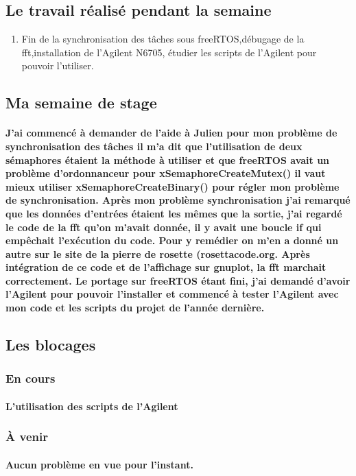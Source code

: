 \documentclass[a4paper]{article}
\begin{document}
 \subsection{Le travail réalisé pendant la semaine}
 \begin{enumerate}
\item {Fin de la synchronisation des tâches sous freeRTOS,débugage de la fft,installation de l'Agilent N6705, étudier les scripts de l'Agilent pour pouvoir l'utiliser.}
\end{enumerate}

\subsection{Ma semaine de stage}
    \paragraph{J'ai commencé à demander de l'aide à Julien pour mon problème de synchronisation des tâches il m'a dit que l'utilisation de deux sémaphores étaient la méthode à utiliser et que freeRTOS avait un problème d'ordonnanceur pour xSemaphoreCreateMutex() il vaut mieux utiliser  xSemaphoreCreateBinary() pour régler mon problème de synchronisation. Après mon problème synchronisation j'ai remarqué que les données d'entrées étaient les mêmes que la sortie, j'ai regardé le code de la fft qu'on m'avait donnée, il y avait une boucle if qui empêchait l'exécution du code. Pour y remédier on m'en a donné un autre sur le site de la pierre de rosette (rosettacode.org. Après intégration de ce code et de l'affichage sur gnuplot, la fft marchait correctement. Le portage sur freeRTOS étant fini, j'ai demandé d'avoir l'Agilent pour pouvoir l'installer et commencé à tester l'Agilent avec mon code et les scripts du projet de l'année dernière.}
    
    \subsection{Les blocages}
\subsubsection{En cours}
    \paragraph{L'utilisation des scripts de l'Agilent}
\subsubsection{À venir}
    \paragraph{Aucun problème en vue pour l'instant.}
	\paragraph{}
\end{document}
